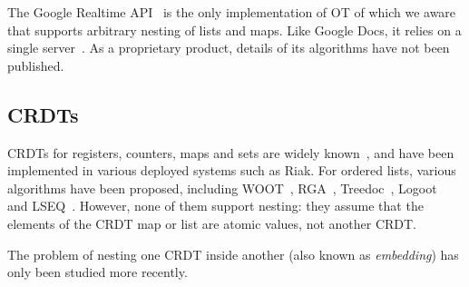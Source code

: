\documentclass[a4paper,twocolumn,10pt]{article}
\begin{document}
The Google Realtime API~\cite{Google:2015vk} is the only implementation of OT of which we aware that supports arbitrary nesting of lists and maps. Like Google Docs, it relies on a single server~\cite{Lemonik:2016wh}. As a proprietary product, details of its algorithms have not been published.

\subsection{CRDTs}

CRDTs for registers, counters, maps and sets are widely known~\cite{Shapiro:2011wy}, and have been implemented in various deployed systems such as Riak. For ordered lists, various algorithms have been proposed, including WOOT~\cite{Oster:2006wj}, RGA~\cite{Roh:2011dw}, Treedoc~\cite{Preguica:2009fz}, Logoot~\cite{Weiss:2010hx} and LSEQ~\cite{Nedelec:2013ky}. However, none of them support nesting: they assume that the elements of the CRDT map or list are atomic values, not another CRDT.

The problem of nesting one CRDT inside another (also known as \emph{embedding}) has only been studied more recently.

{\footnotesize

{}}
\end{document}
